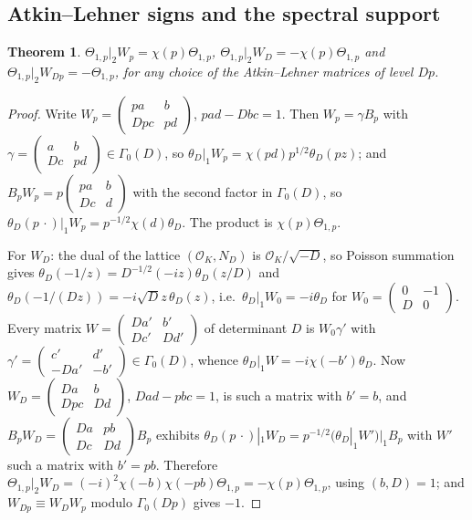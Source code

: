 \documentclass[11pt]{amsart}
\newtheorem{theorem}{Theorem}[section]
\theoremstyle{remark}
\begin{document}
\subsection{Atkin--Lehner signs and the spectral support}\label{subsec:support}
\begin{theorem}\label{thm:AL}
$\Theta_{1,p}|_2W_p=\chi(p)\Theta_{1,p}$, $\Theta_{1,p}|_2W_D=-\chi(p)\Theta_{1,p}$ and $\Theta_{1,p}|_2W_{Dp}=-\Theta_{1,p}$, for any choice of the Atkin--Lehner matrices \cite{AL} of level $Dp$.
\end{theorem}
\begin{proof}
Write $W_p=\left(\begin{smallmatrix}pa&b\\Dpc&pd\end{smallmatrix}\right)$, $pad-Dbc=1$. Then $W_p=\gamma B_p$ with $\gamma=\left(\begin{smallmatrix}a&b\\Dc&pd\end{smallmatrix}\right)\in\Gamma_0(D)$, so $\theta_D|_1W_p=\chi(pd)p^{1/2}\theta_D(pz)$; and $B_pW_p=p\left(\begin{smallmatrix}pa&b\\Dc&d\end{smallmatrix}\right)$ with the second factor in $\Gamma_0(D)$, so $\theta_D(p\,\cdot)|_1W_p=p^{-1/2}\chi(d)\theta_D$. The product is $\chi(p)\Theta_{1,p}$.

For $W_D$: the dual of the lattice $(\mathcal O_K,N_D)$ is $\mathcal O_K/\sqrt{-D}$, so Poisson summation gives $\theta_D(-1/z)=D^{-1/2}(-iz)\theta_D(z/D)$ and $\theta_D(-1/(Dz))=-i\sqrt Dz\,\theta_D(z)$, i.e.\ $\theta_D|_1W_0=-i\theta_D$ for $W_0=\left(\begin{smallmatrix}0&-1\\D&0\end{smallmatrix}\right)$. Every matrix $W=\left(\begin{smallmatrix}Da'&b'\\Dc'&Dd'\end{smallmatrix}\right)$ of determinant $D$ is $W_0\gamma'$ with $\gamma'=\left(\begin{smallmatrix}c'&d'\\-Da'&-b'\end{smallmatrix}\right)\in\Gamma_0(D)$, whence $\theta_D|_1W=-i\chi(-b')\theta_D$. Now $W_D=\left(\begin{smallmatrix}Da&b\\Dpc&Dd\end{smallmatrix}\right)$, $Dad-pbc=1$, is such a matrix with $b'=b$, and $B_pW_D=\left(\begin{smallmatrix}Da&pb\\Dc&Dd\end{smallmatrix}\right)B_p$ exhibits $\theta_D(p\,\cdot)|_1W_D=p^{-1/2}(\theta_D|_1W')|_1B_p$ with $W'$ such a matrix with $b'=pb$. Therefore $\Theta_{1,p}|_2W_D=(-i)^2\chi(-b)\chi(-pb)\Theta_{1,p}=-\chi(p)\Theta_{1,p}$, using $(b,D)=1$; and $W_{Dp}\equiv W_DW_p$ modulo $\Gamma_0(Dp)$ gives $-1$.
\end{proof}
\end{document}
